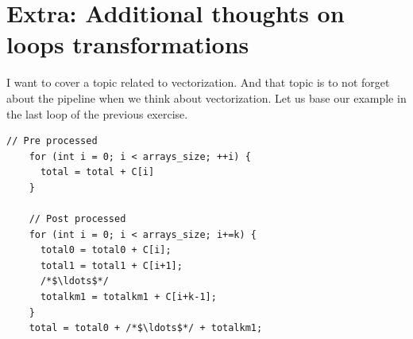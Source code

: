 \documentclass[
    12pt, %
]{fphw}
\begin{document}







\section{Extra: Additional thoughts on loops transformations}

    I want to cover a topic related to vectorization.
And that topic is to not forget about the pipeline when we think about vectorization.
Let us base our example in the last loop of the previous exercise.

\begin{lstlisting}[gobble=4]
    // Pre processed
    for (int i = 0; i < arrays_size; ++i) {
      total = total + C[i]
    }

    // Post processed
    for (int i = 0; i < arrays_size; i+=k) {
      total0 = total0 + C[i];
      total1 = total1 + C[i+1];
      /*$\ldots$*/
      totalkm1 = totalkm1 + C[i+k-1];
    }
    total = total0 + /*$\ldots$*/ + totalkm1;

\end{lstlisting}
\end{document}
